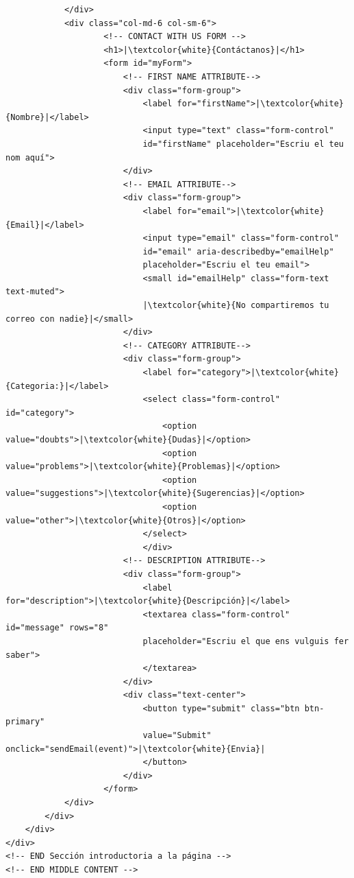 \documentclass{article}
\begin{document}
\begin{verbatim}
            </div>
            <div class="col-md-6 col-sm-6">
                    <!-- CONTACT WITH US FORM -->
                    <h1>|\textcolor{white}{Contáctanos}|</h1>
                    <form id="myForm">
                        <!-- FIRST NAME ATTRIBUTE-->
                        <div class="form-group">
                            <label for="firstName">|\textcolor{white}{Nombre}|</label>
                            <input type="text" class="form-control" 
                            id="firstName" placeholder="Escriu el teu nom aquí">
                        </div>
                        <!-- EMAIL ATTRIBUTE-->
                        <div class="form-group">
                            <label for="email">|\textcolor{white}{Email}|</label>
                            <input type="email" class="form-control" 
                            id="email" aria-describedby="emailHelp" 
                            placeholder="Escriu el teu email">
                            <small id="emailHelp" class="form-text text-muted">
                            |\textcolor{white}{No compartiremos tu correo con nadie}|</small>
                        </div>
                        <!-- CATEGORY ATTRIBUTE-->
                        <div class="form-group">
                            <label for="category">|\textcolor{white}{Categoria:}|</label>
                            <select class="form-control" id="category">
                                <option value="doubts">|\textcolor{white}{Dudas}|</option>
                                <option value="problems">|\textcolor{white}{Problemas}|</option>
                                <option value="suggestions">|\textcolor{white}{Sugerencias}|</option>
                                <option value="other">|\textcolor{white}{Otros}|</option>
                            </select>
                            </div>
                        <!-- DESCRIPTION ATTRIBUTE-->  
                        <div class="form-group">
                            <label for="description">|\textcolor{white}{Descripción}|</label>
                            <textarea class="form-control" id="message" rows="8" 
                            placeholder="Escriu el que ens vulguis fer saber">
                            </textarea>
                        </div>
                        <div class="text-center">
                            <button type="submit" class="btn btn-primary" 
                            value="Submit" onclick="sendEmail(event)">|\textcolor{white}{Envia}|
                            </button>
                        </div>
                    </form>
            </div>
        </div>
    </div>
</div>
<!-- END Sección introductoria a la página -->
<!-- END MIDDLE CONTENT -->
\end{verbatim}
\end{document}
